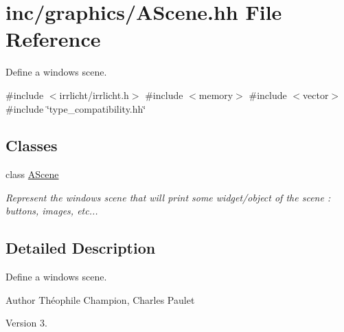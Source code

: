 \hypertarget{AScene_8hh}{}\section{inc/graphics/\+A\+Scene.hh File Reference}
\label{AScene_8hh}


Define a window\textquotesingle{}s scene.  


{\ttfamily \#include $<$irrlicht/irrlicht.\+h$>$}\newline
{\ttfamily \#include $<$memory$>$}\newline
{\ttfamily \#include $<$vector$>$}\newline
{\ttfamily \#include \char`\"{}type\+\_\+compatibility.\+hh\char`\"{}}\newline
\subsection*{Classes}
\begin{DoxyCompactItemize}
\item 
class \hyperlink{classAScene}{A\+Scene}
\begin{DoxyCompactList}\small\item\em Represent the window\textquotesingle{}s scene that will print some widget/object of the scene \+: buttons, images, etc... \end{DoxyCompactList}\end{DoxyCompactItemize}


\subsection{Detailed Description}
Define a window\textquotesingle{}s scene. 

\begin{DoxyAuthor}{Author}
Théophile Champion, Charles Paulet 
\end{DoxyAuthor}
\begin{DoxyVersion}{Version}
3. 
\end{DoxyVersion}
